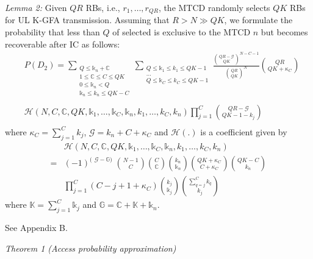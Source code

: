 \documentclass[a4paper]{IEEEtran}
\begin{document}
\textit{Lemma 2:} Given $QR$ RBs, i.e., $r_1, \dots, r_{QR}$, the MTCD randomly selects $QK$ RBs for UL K-GFA transmission. Assuming that $R > N \gg QK$, we formulate the probability that less than $Q$ of selected is exclusive to the MTCD $n$ but becomes recoverable after IC as follows:
\begin{equation}
\begin{split}
&P(D_2) = 
\sum\limits_{\substack{
Q \leq \mathbb{k}_{n} + \mathbb{C}\\ 
1\leq \mathbb{C} \leq C \leq QK\\
0 \leq \mathbb{k}_{n} < Q \\ 
\mathbb{k}_{n} \leq k_{n} \leq QK - C\\
}}
\sum\limits_{\substack{ 
Q \leq \mathbb{k}_{1} \leq k_{1} \leq QK-1 \\ 
\dots\\
Q \leq \mathbb{k}_{C} \leq k_{C} \leq QK-1 \\ 
}} 
\frac{{QR - \mathcal{G} \choose QK}^{N - C - 1}}
{{QR \choose QK}^{N}}
{QR \choose QK + \kappa_{C}}
\\
&\mathcal{H}(N, C, \mathbb{C}, QK, \mathbb{k}_{1}, \dots, \mathbb{k}_{C}, \mathbb{k}_{n}, k_{1}, \dots, k_{C}, k_{n})
\prod^{C}_{j = 1} 
{QR - \mathcal{G} \choose QK - 1 - k_j}
\\
\label{eq: lemma 2}
\end{split}
\end{equation}
where $\kappa_{C} = \sum^{C}_{j=1}k_j$, $\mathcal{G} = k_{n} + C + \kappa_{C}$ and $\mathcal{H}(.)$ is a coefficient given by
\begin{equation}
\begin{split}
&\mathcal{H}(N, C, \mathbb{C}, QK, \mathbb{k}_{1}, \dots, \mathbb{k}_{C}, \mathbb{k}_{n}, k_{1}, \dots, k_{C}, k_{n})\\
= &(-1)^{(\substack{\mathcal{G} - \mathbb{G})}}
{N-1 \choose C} {C \choose \mathbb{C}}
{k_n \choose \mathbb{k}_n}
{QK + \kappa_{C} \choose C + \kappa_{C}}
{QK - C \choose k_n}\\
&\prod^{C}_{j = 1} (C - j + 1 + \kappa_C) {k_j \choose \mathbb{k}_j} { \sum^{C}_{q = j} k_q \choose k_j}
\end{split}
\end{equation}
where $\mathbb{K} = \sum^{C}_{j = 1} \mathbb{k}_j$ and $\mathbb{G} = \mathbb{C} + \mathbb{K} + \mathbb{k}_n$.

\begin{IEEEproof}
See Appendix B.
\end{IEEEproof}
\textit{Theorem 1 (Access probability approximation)} 
\end{document}

